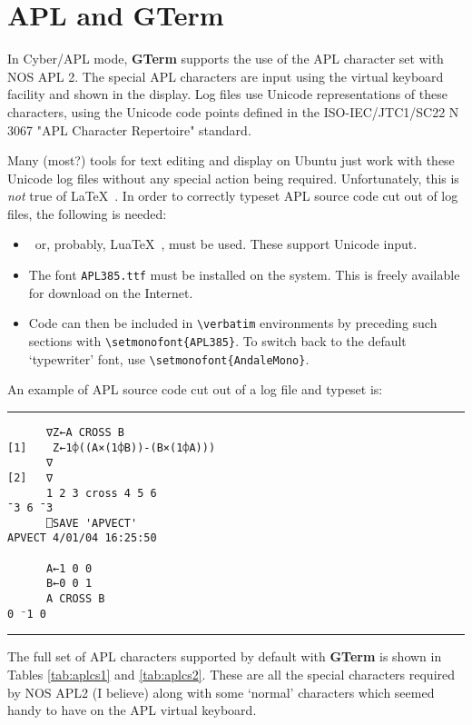 \documentclass[a4paper,twoside,11pt]{article}
\newcommand{\newpara}{\par\vspace{4mm}\noindent}
\begin{document}
\section{APL and \textbf{GTerm}}\label{aplinfo}
In Cyber/APL mode, \textbf{GTerm} supports the use of the APL character set with NOS APL 2. The special
APL characters are input using the virtual keyboard facility and shown in the display. Log files
use Unicode representations of these characters, using the Unicode code points defined in the
ISO-IEC/JTC1/SC22 N 3067 "APL Character Repertoire" standard.
\newpara
Many (most?) tools for text editing and display on Ubuntu just work with these Unicode log
files without any special action being required. Unfortunately, this is \textit{not} true of \LaTeX\ .
In order to correctly typeset APL source code cut out of log files, the following is needed:
\begin{itemize}
\item \XeTeX\ or, probably, Lua\TeX\ , must be used. These support Unicode input. 
\item The font \texttt{APL385.ttf} must be installed on the system. This is freely
      available for download on the Internet.
\item Code can then be included in \texttt{\textbackslash{}verbatim} 
      environments by preceding such sections with
      \texttt{\textbackslash{}setmonofont\{APL385\}}. 
      To switch back to the default `typewriter' font, use
      \texttt{\textbackslash{}setmonofont\{AndaleMono\}}. 
\end{itemize}
An example of APL source code cut out of a log file and typeset is:
\newpara
\hrule
\setmonofont{APL385}
\begin{verbatim}
      ∇Z←A CROSS B
[1]    Z←1⌽((A×(1⌽B))-(B×(1⌽A)))
      ∇
[2]   ∇
      1 2 3 cross 4 5 6
¯3 6 ¯3
      ⎕SAVE 'APVECT'
APVECT 4/01/04 16:25:50

      A←1 0 0
      B←0 0 1
      A CROSS B
0 ⁻1 0
\end{verbatim}
\hrule
\newpara
The full set of APL characters supported by default with \textbf{GTerm} is shown in 
Tables \ref{tab:aplcs1} and \ref{tab:aplcs2}.
These are all the special characters required by NOS APL2 (I believe) along with some `normal' characters which seemed
handy to have on the APL virtual keyboard.
\end{document}
